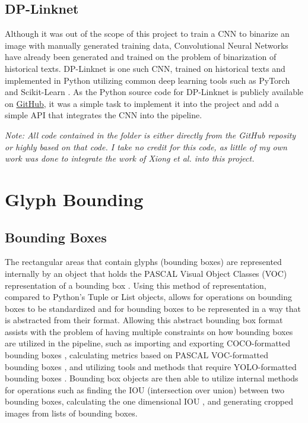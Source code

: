 \subsection{DP-Linknet}

Although it was out of the scope of this project to train a CNN to binarize an image with manually generated training data, Convolutional Neural Networks have already been generated and trained on the problem of binarization of historical texts. DP-Linknet \cite{Xiong} is one such CNN, trained on historical texts and implemented in Python utilizing common deep learning tools such as PyTorch \cite{PyTorch} and Scikit-Learn \cite{Scikit}. As the Python source code for DP-Linknet is publicly available on \href{https://github.com/beargolden/DP-LinkNet}{GitHub}, it was a simple task to implement it into the project and add a simple API that integrates the CNN into the pipeline.

\textit{Note: All code contained in the}  \textit{folder is either directly from the GitHub reposity or highly based on that code. I take no credit for this code, as little of my own work was done to integrate the work of Xiong et al. into this project.}


\section{Glyph Bounding}

\subsection{Bounding Boxes}

The rectangular areas that contain glyphs (bounding boxes) are represented internally by an object that holds the PASCAL Visual Object Classes (VOC) representation of a bounding box . Using this method of representation, compared to Python's Tuple or List objects, allows for operations on bounding boxes to be standardized and for bounding boxes to be represented in a way that is abstracted from their format. Allowing this abstract bounding box format assists with the problem of having multiple constraints on how bounding boxes are utilized in the pipeline, such as importing and exporting COCO-formatted bounding boxes , calculating metrics based on PASCAL VOC-formatted bounding boxes , and utilizing tools and methods that require YOLO-formatted bounding boxes . Bounding box objects are then able to utilize internal methods for operations such as finding the IOU (intersection over union)  between two bounding boxes, calculating the one dimensional IOU , and generating cropped images from lists of bounding boxes.


